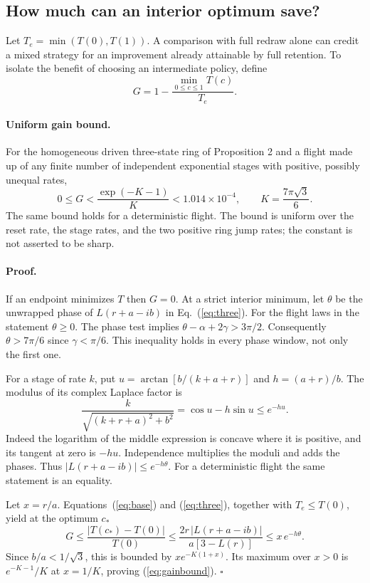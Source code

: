 \subsection{How much can an interior optimum save?}
Let $T_e=\min(T(0),T(1))$. A comparison with full redraw alone can credit a mixed strategy for an improvement already attainable by full retention. To isolate the benefit of choosing an intermediate policy, define
\[
   G=1-\frac{\min_{0\le c\le1}T(c)}{T_e}.
\]

\paragraph{Uniform gain bound.}
For the homogeneous driven three-state ring of Proposition 2 and a flight made up of any finite number of independent exponential stages with positive, possibly unequal rates,
\begin{equation}
  0\le G < \frac{\exp(-K-1)}{K}<1.014\times10^{-4},
  \qquad K=\frac{7\pi\sqrt{3}}{6}.
  \label{eq:gainbound}
\end{equation}
The same bound holds for a deterministic flight. The bound is uniform over the reset rate, the stage rates, and the two positive ring jump rates; the constant is not asserted to be sharp.

\paragraph{Proof.}
If an endpoint minimizes $T$ then $G=0$. At a strict interior minimum, let $\theta$ be the unwrapped phase of $L(r+a-ib)$ in Eq.~(\ref{eq:three}). For the flight laws in the statement $\theta\ge0$. The phase test implies $\theta-\alpha+2\gamma>3\pi/2$. Consequently $\theta>7\pi/6$ since $\gamma<\pi/6$. This inequality holds in every phase window, not only the first one.

For a stage of rate $k$, put $u=\arctan[b/(k+a+r)]$ and $h=(a+r)/b$. The modulus of its complex Laplace factor is
\[
 \frac{k}{\sqrt{(k+r+a)^2+b^2}}=\cos u-h\sin u\le e^{-hu}.
\]
Indeed the logarithm of the middle expression is concave where it is positive, and its tangent at zero is $-hu$. Independence multiplies the moduli and adds the phases. Thus $|L(r+a-ib)|\le e^{-h\theta}$. For a deterministic flight the same statement is an equality.

Let $x=r/a$. Equations~(\ref{eq:base}) and (\ref{eq:three}), together with $T_e\le T(0)$, yield at the optimum $c_*$
\[
 G\le \frac{|T(c_*)-T(0)|}{T(0)}
 \le \frac{2r\,|L(r+a-ib)|}{a[3-L(r)]}
 \le x\,e^{-h\theta}.
\]
Since $b/a<1/\sqrt3$, this is bounded by $x e^{-K(1+x)}$. Its maximum over $x>0$ is $e^{-K-1}/K$ at $x=1/K$, proving (\ref{eq:gainbound}). \hfill$\square$

